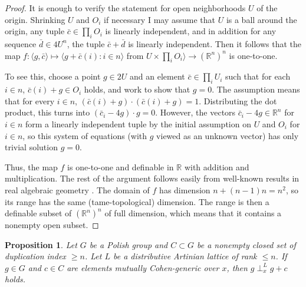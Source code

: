 \documentclass{article}
\newtheorem{proposition}[theorem]{Proposition}
\theoremstyle{definition}
\begin{document}
\begin{proof}
It is enough to verify the statement for open neighborhoods $U$ of the origin. Shrinking $U$ and $O_i$ if necessary I may assume that $U$ is a ball around the origin, any tuple $\bar c\in\prod_iO_i$ is linearly independent, and in addition for any sequence $\bar d\in 4U^n$, the tuple $\bar c+\bar d$ is linearly independent. Then it follows that the map $f\colon \langle g, \bar c\rangle\mapsto \langle g+\bar c(i)\colon i\in n\rangle$ from $U\times \prod_iO_i\rangle\to (\mathbb{R}^n)^n$ is one-to-one.

To see this, choose a point $g\in 2U$ and an element $\bar c\in\prod_iU_i$ such that for each $i\in n$, $\bar c(i)+g\in O_i$ holds, and work to show that $g=0$. The assumption means that for every $i\in n$, $(\bar c(i)+g)\cdot (\bar c(i)+g)=1$. Distributing the dot product, this turns into $(\bar c_i-4g)\cdot g=0$. However, the vectors $\bar c_i-4g\in \mathbb{R}^n$ for $i\in n$ form a linearly independent tuple by the initial assumption on $U$ and $O_i$ for $i\in n$, so this system of equations (with $g$ viewed as an unknown vector) has only trivial solution $g=0$.

Thus, the map $f$ is one-to-one and definable in $\mathbb{R}$ with addition and multiplication. The rest of the argument follows easily from well-known results in real algebraic geometry \cite{vandendries:tame}. The domain of $f$ has dimension $n+(n-1)n=n^2$, so its range has the same (tame-topological) dimension. The range is then a definable subset of $(\mathbb R^n)^n$ of full dimension, which means that it contains a nonempty open subset.
\end{proof}

\begin{proposition}
\label{ab}
Let $G$ be a Polish group and $C\subset G$ be a nonempty closed set of duplication index $\geq n$. Let $L$ be a distributive Artinian lattice of rank $\leq n$. If $g\in G$ and $c\in C$ are elements mutually Cohen-generic over $x$, then $g\perp^L_xg+c$ holds.
\end{proposition}
\end{document}
